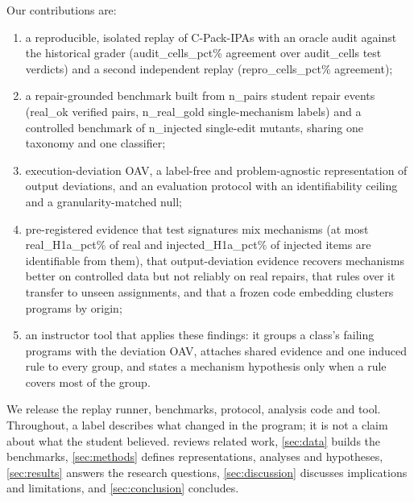 Our contributions are:
\begin{enumerate}
\item a reproducible, isolated replay of C-Pack-IPAs with an oracle audit against the historical grader ({{audit_cells_pct}}\% agreement over {{audit_cells}} test verdicts) and a second independent replay ({{repro_cells_pct}}\% agreement);
\item a repair-grounded benchmark built from {{n_pairs}} student repair events ({{real_ok}} verified pairs, {{n_real_gold}} single-mechanism labels) and a controlled benchmark of {{n_injected}} single-edit mutants, sharing one taxonomy and one classifier;
\item execution-deviation OAV, a label-free and problem-agnostic representation of output deviations, and an evaluation protocol with an identifiability ceiling and a granularity-matched null;
\item pre-registered evidence that test signatures mix mechanisms (at most {{real_H1a_pct}}\% of real and {{injected_H1a_pct}}\% of injected items are identifiable from them), that output-deviation evidence recovers mechanisms better on controlled data but not reliably on real repairs, that rules over it transfer to unseen assignments, and that a frozen code embedding clusters programs by origin;
\item an instructor tool that applies these findings: it groups a class's failing programs with the deviation OAV, attaches shared evidence and one induced rule to every group, and states a mechanism hypothesis only when a rule covers most of the group.
\end{enumerate}
We release the replay runner, benchmarks, protocol, analysis code and tool. Throughout, a label describes what changed in the program; it is not a claim about what the student believed.  reviews related work, \cref{sec:data} builds the benchmarks, \cref{sec:methods} defines representations, analyses and hypotheses, \cref{sec:results} answers the research questions, \cref{sec:discussion} discusses implications and limitations, and \cref{sec:conclusion} concludes.
